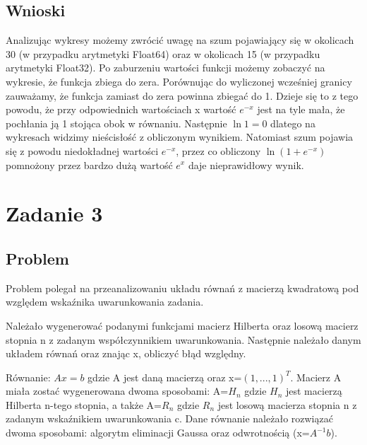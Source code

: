 \documentclass{article}
\begin{document}
\subsection{Wnioski}
Analizując wykresy możemy zwrócić uwagę na szum pojawiający się w okolicach 30 (w przypadku arytmetyki Float64) oraz w okolicach 15 (w przypadku arytmetyki Float32). Po zaburzeniu wartości funkcji możemy zobaczyć na wykresie, że funkcja zbiega do zera. Porównując do wyliczonej wcześniej granicy zauważamy, że funkcja zamiast do zera powinna zbiegać do 1. Dzieje się to z tego powodu, że przy odpowiednich wartościach x wartość $e^{-x}$ jest na tyle mała, że pochłania ją 1 stojąca obok w równaniu. Następnie $\ln 1 = 0$ dlatego na wykresach widzimy nieścisłość z obliczonym wynikiem. Natomiast szum pojawia się z powodu niedokładnej wartości $e^{-x}$, przez co obliczony $\ln{(1 + e^{-x})}$ pomnożony przez bardzo dużą wartość $e^x$ daje nieprawidłowy wynik.



\section{Zadanie 3}
\subsection{Problem}
Problem polegał na przeanalizowaniu układu równań z macierzą kwadratową pod względem wskaźnika uwarunkowania zadania.

Należało wygenerować podanymi funkcjami macierz Hilberta oraz losową macierz stopnia n z zadanym współczynnikiem uwarunkowania. Następnie należało danym układem równań oraz znając x, obliczyć błąd względny.

Równanie: $Ax = b$ gdzie A jest daną macierzą oraz x=$(1,...,1)^{T}$. Macierz A miała zostać wygenerowana dwoma sposobami: A=$H_{n}$ gdzie $H_{n}$ jest macierzą Hilberta n-tego stopnia, a także A=$R_{n}$ gdzie $R_{n}$ jest losową macierza stopnia n z zadanym wskaźnikiem uwarunkowania c. Dane równanie należało rozwiązać dwoma sposobami: algorytm eliminacji Gaussa oraz odwrotnością (x=$A^{-1}b$).
\end{document}

